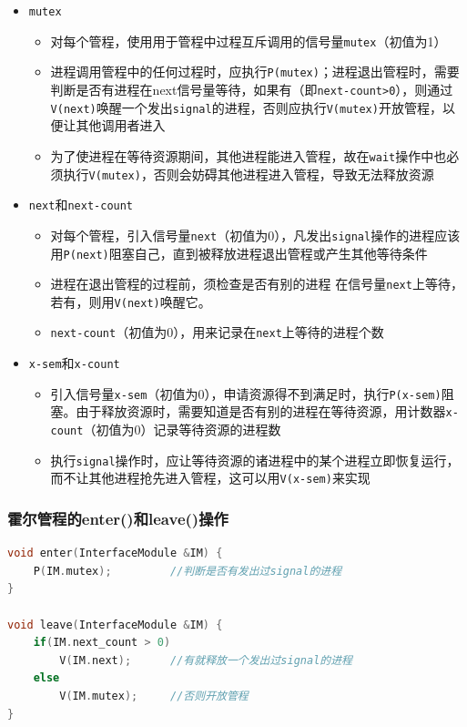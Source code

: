 \documentclass[cs4size,a4paper,10pt]{ctexart}
\begin{document}
	\begin{itemize}
		\item \verb|mutex|
		\begin{itemize}
			\item 对每个管程，使用用于管程中过程互斥调用的信号量\verb|mutex|（初值为1）
			\item 进程调用管程中的任何过程时，应执行\verb|P(mutex)|；进程退出管程时，需要判断是否有进程在next信号量等待，如果有（即\verb|next-count>0|），则通过\verb|V(next)|唤醒一个发出\verb|signal|的进程，否则应执行\verb|V(mutex)|开放管程，以便让其他调用者进入
			\item 为了使进程在等待资源期间，其他进程能进入管程，故在\verb|wait|操作中也必须执行\verb|V(mutex)|，否则会妨碍其他进程进入管程，导致无法释放资源
		\end{itemize}
		\item \verb|next|和\verb|next-count|
		\begin{itemize}
			\item 对每个管程，引入信号量\verb|next|（初值为0），凡发出\verb|signal|操作的进程应该用\verb|P(next)|阻塞自己，直到被释放进程退出管程或产生其他等待条件
			\item 进程在退出管程的过程前，须检查是否有别的进程 在信号量\verb|next|上等待，若有，则用\verb|V(next)|唤醒它。
			\item \verb|next-count|（初值为0），用来记录在\verb|next|上等待的进程个数
		\end{itemize}
		\item \verb|x-sem|和\verb|x-count|
		\begin{itemize}
			\item 引入信号量\verb|x-sem|（初值为0），申请资源得不到满足时，执行\verb|P(x-sem)|阻塞。由于释放资源时，需要知道是否有别的进程在等待资源，用计数器\verb|x-count|（初值为0）记录等待资源的进程数
			\item 执行\verb|signal|操作时，应让等待资源的诸进程中的某个进程立即恢复运行，而不让其他进程抢先进入管程，这可以用\verb|V(x-sem)|来实现
		\end{itemize}
	\end{itemize}

	\subsubsection{霍尔管程的enter()和leave()操作}
	\begin{lstlisting}[language=C, keywordstyle=\color{black}]
void enter(InterfaceModule &IM) {
	P(IM.mutex);         //判断是否有发出过signal的进程
}

void leave(InterfaceModule &IM) {
	if(IM.next_count > 0)
		V(IM.next);      //有就释放一个发出过signal的进程
	else
		V(IM.mutex);     //否则开放管程
}
	\end{lstlisting}
\end{document}
